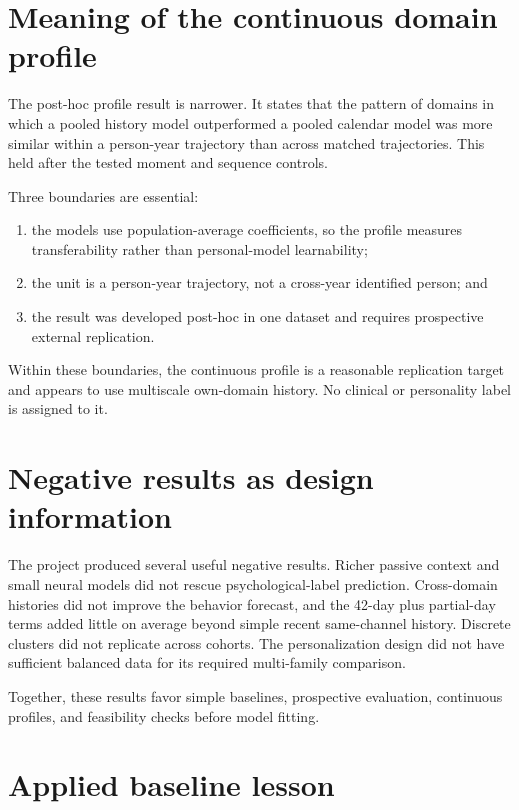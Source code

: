 \documentclass[a4paper,11pt,oneside]{report}
\begin{document}
\section{Meaning of the continuous domain profile}

The post-hoc profile result is narrower. It states that the pattern of domains in
which a pooled history model outperformed a pooled calendar model was more similar
within a person-year trajectory than across matched trajectories. This held after
the tested moment and sequence controls.

Three boundaries are essential:

\begin{enumerate}
  \item the models use population-average coefficients, so the profile measures
  transferability rather than personal-model learnability;
  \item the unit is a person-year trajectory, not a cross-year identified person;
  and
  \item the result was developed post-hoc in one dataset and requires prospective
  external replication.
\end{enumerate}

Within these boundaries, the continuous profile is a reasonable replication target
and appears to use multiscale own-domain history. No clinical or personality label is
assigned to it.

\section{Negative results as design information}

The project produced several useful negative results. Richer passive context and
small neural models did not rescue psychological-label prediction. Cross-domain
histories did not improve the behavior forecast, and the 42-day plus partial-day
terms added little on average beyond simple recent same-channel history. Discrete clusters did not replicate
across cohorts. The personalization design did not have sufficient balanced data for
its required multi-family comparison.

Together, these results favor simple baselines, prospective evaluation, continuous
profiles, and feasibility checks before model fitting.

\section{Applied baseline lesson}
\end{document}
